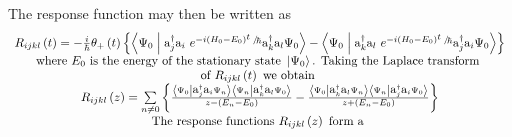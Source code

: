 \documentclass{amsart}
\begin{document}
The response function may then be written as
\[
\begin{array}{c}
 R_{ijkl} \left( t \right)=-\frac{i}{\hbar }\theta _+ \left( t
\right)\left\{ {\left\langle {\Psi _0 } \mathrel{\left| {\vphantom {{\Psi _0
} {\mbox{a}_j^\dag \mbox{a}_i \mbox{ }e^{-i\left( {H_0 -E_0 }
\right)\raise0.5ex\hbox{$\scriptstyle {t\mbox{
}}$}\kern-0.1em/\kern-0.15em\lower0.25ex\hbox{$\scriptstyle \hbar
$}}\mbox{a}_k^\dag \mbox{a}_l \Psi _0 }}} \right. \kern-\nulldelimiterspace}
{\mbox{a}_j^\dag \mbox{a}_i \mbox{ }e^{-i\left( {H_0 -E_0 }
\right)\raise0.5ex\hbox{$\scriptstyle {t\mbox{
}}$}\kern-0.1em/\kern-0.15em\lower0.25ex\hbox{$\scriptstyle \hbar
$}}\mbox{a}_k^\dag \mbox{a}_l \Psi _0 } \right\rangle -\left\langle {\Psi _0
} \mathrel{\left| {\vphantom {{\Psi _0 } {\mbox{a}_k^\dag \mbox{a}_l \mbox{
}e^{-i\left( {H_0 -E_0 } \right)\raise0.5ex\hbox{$\scriptstyle {t\mbox{
}}$}\kern-0.1em/\kern-0.15em\lower0.25ex\hbox{$\scriptstyle \hbar
$}}\mbox{a}_j^\dag \mbox{a}_i \Psi _0 }}} \right. \kern-\nulldelimiterspace}
{\mbox{a}_k^\dag \mbox{a}_l \mbox{ }e^{-i\left( {H_0 -E_0 }
\right)\raise0.5ex\hbox{$\scriptstyle {t\mbox{
}}$}\kern-0.1em/\kern-0.15em\lower0.25ex\hbox{$\scriptstyle \hbar
$}}\mbox{a}_j^\dag \mbox{a}_i \Psi _0 } \right\rangle } \right\} \\
 \mbox{where }E_0 \mbox{ is the energy of the stationary state }\left| {\Psi
_0 } \right\rangle \mbox{. Taking the Laplace transform } \\
 \mbox{of }R_{ijkl} \left( t \right)\mbox{ we obtain } \\
 R_{ijkl} \left( z \right)=\sum\limits_{n\ne 0} {\left\{ {\frac{\left\langle
{\Psi _0 } \mathrel{\left| {\vphantom {{\Psi _0 } {\mbox{a}_j^\dag
\mbox{a}_i \Psi _n }}} \right. \kern-\nulldelimiterspace} {\mbox{a}_j^\dag
\mbox{a}_i \Psi _n } \right\rangle \left\langle {\Psi _n } \mathrel{\left|
{\vphantom {{\Psi _n } {\mbox{a}_k^\dag \mbox{a}_l \Psi _0 }}} \right.
\kern-\nulldelimiterspace} {\mbox{a}_k^\dag \mbox{a}_l \Psi _0 }
\right\rangle }{z-\left( {E_n -E_0 } \right)}-\frac{\left\langle {\Psi _0 }
\mathrel{\left| {\vphantom {{\Psi _0 } {\mbox{a}_k^\dag \mbox{a}_l \Psi _n
}}} \right. \kern-\nulldelimiterspace} {\mbox{a}_k^\dag \mbox{a}_l \Psi _n }
\right\rangle \left\langle {\Psi _n } \mathrel{\left| {\vphantom {{\Psi _n }
{\mbox{a}_j^\dag \mbox{a}_i \Psi _0 }}} \right. \kern-\nulldelimiterspace}
{\mbox{a}_j^\dag \mbox{a}_i \Psi _0 } \right\rangle }{z+\left( {E_n -E_0 }
\right)}} \right\}} \\
 \mbox{The response functions }R_{ijkl} \left( z \right)\mbox{ form a
}
\end{array}\]
\end{document}
